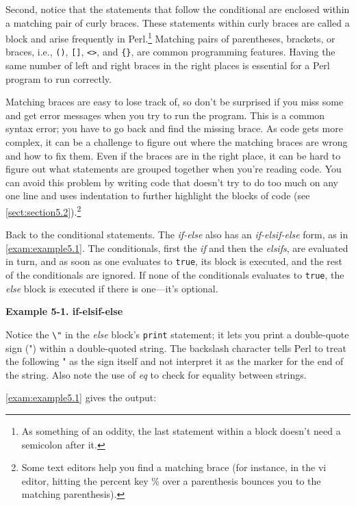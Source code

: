 Second, notice that the statements that follow the conditional are enclosed within a matching pair of curly braces. These statements within curly braces are called a block and arise frequently in Perl.\footnote{As something of an oddity, the last statement within a block doesn't need a semicolon after it.} Matching pairs of parentheses, brackets, or braces, i.e., \verb|()|, \verb|[]|, \verb|<>|, and \verb|{}|, are common programming features. Having the same number of left and right braces in the right places is essential for a Perl program to run correctly.

Matching braces are easy to lose track of, so don't be surprised if you miss some and get error messages when you try to run the program. This is a common syntax error; you have to go back and find the missing brace. As code gets more complex, it can be a challenge to figure out where the matching braces are wrong and how to fix them. Even if the braces are in the right place, it can be hard to figure out what statements are grouped together when you're reading code. You can avoid this problem by writing code that doesn't try to do too much on any one line and uses indentation to further highlight the blocks of code (see \autoref{sect:section5.2}).\footnote{Some text editors help you find a matching brace (for instance, in the vi editor, hitting the percent key \% over a parenthesis bounces you to the matching parenthesis).} 

Back to the conditional statements. The \textit{if-else} also has an \textit{if-elsif-else} form, as in \autoref{exam:example5.1}. The conditionals, first the \textit{if} and then the \textit{elsifs}, are evaluated in turn, and as soon as one evaluates to \verb|true|, its block is executed, and the rest of the conditionals are ignored. If none of the conditionals evaluates to \verb|true|, the \textit{else} block is executed if there is one—it's optional. 

\textbf{Example 5-1. if-elsif-else }


Notice the \verb|\"| in the \textit{else} block's \verb|print| statement; it lets you print a double-quote sign (") within a double-quoted string. The backslash character tells Perl to treat the following " as the sign itself and not interpret it as the marker for the end of the string. Also note the use of \textit{eq} to check for equality between strings.

\autoref{exam:example5.1} gives the output:

